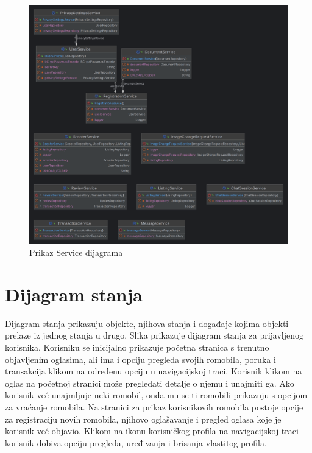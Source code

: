 \begin{figure} [H]

	\includegraphics[width=1\linewidth]{slike/ServiceDiagram.png}
	\centering
	\caption{Prikaz Service dijagrama}
	\label{fig:Prikaz Service dijagrama}
\end{figure}


\section{Dijagram stanja}

Dijagram stanja prikazuju objekte, njihova stanja i događaje kojima objekti prelaze iz jednog stanja u drugo. Slika prikazuje dijagram stanja za prijavljenog korisnika. Korisniku se inicijalno prikazuje početna stranica s trenutno objavljenim oglasima, ali ima i opciju pregleda svojih romobila, poruka i transakcija klikom na određenu opciju u navigacijskoj traci. Korisnik klikom na oglas na početnoj stranici može pregledati detalje o njemu i unajmiti ga. Ako korisnik već unajmljuje neki romobil, onda mu se ti romobili prikazuju s opcijom za vraćanje romobila. Na stranici za prikaz korisnikovih romobila postoje opcije za registraciju novih romobila, njihovo oglašavanje i pregled oglasa koje je korisnik već objavio. Klikom na ikonu korisničkog profila na navigacijskoj traci korisnik dobiva opciju pregleda, uređivanja i brisanja vlastitog profila.

